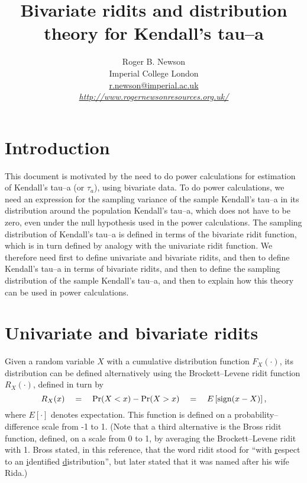 \documentclass[a4paper]{article}      %
\title{Bivariate ridits and distribution theory for Kendall's tau--a}  %
\author{
Roger B. Newson
\\ Imperial College London
\\ \href{mailto:r.newson@imperial.ac.uk}{r.newson@imperial.ac.uk}
\\ \href{http://www.rogernewsonresources.org.uk/}{\textsl{http://www.rogernewsonresources.org.uk/}}
}      %
\begin{document}

\maketitle                   %

\section{Introduction}

This document is motivated by the need to do power calculations for estimation of Kendall's tau--a (or $\tau_a$),
using bivariate data.
To do power calculations, we need an expression for the sampling variance of the sample Kendall's tau--a
in its distribution around the population Kendall's tau--a,
which does not have to be zero, even under the null hypothesis used in the power calculations.
The sampling distribution of Kendall's tau--a is defined in terms of the bivariate ridit function,
which is in turn defined by analogy with the univariate ridit function.
We therefore need first to define univariate and bivariate ridits,
and then to define Kendall's tau--a in terms of bivariate ridits,
and then to define the sampling distribution of the sample Kendall's tau--a,
and then to explain how this theory can be used in power calculations.

\section{Univariate and bivariate ridits}

Given a random variable $X$ with a cumulative distribution function $F_X(\cdot)$,
its distribution can be defined alternatively
using the Brockett--Levene ridit function\cite{brockettlevene1977} $R_X(\cdot)$,
defined in turn by
\def\sign{{\rm sign}}
\def\Pr{{\rm Pr}}
\begin{equation}
R_X(x) \quad = \quad \Pr(X<x)-\Pr(X>x) \quad = \quad E\left[\sign(x-X)\right],
\end{equation}
where $E[\cdot]$ denotes expectation.
This function is defined on a probability--difference scale from -1 to 1.
(Note that a third alternative is the Bross ridit function\cite{bross1958},
defined, on a scale from 0 to 1, by averaging the Brockett--Levene ridit with 1.
Bross stated, in this reference, that the word ridit stood for ``with \underline{r}espect to an \underline{i}dentified \underline{d}istribution'',
but later stated that it was named after his wife Rida.)
\end{document}
